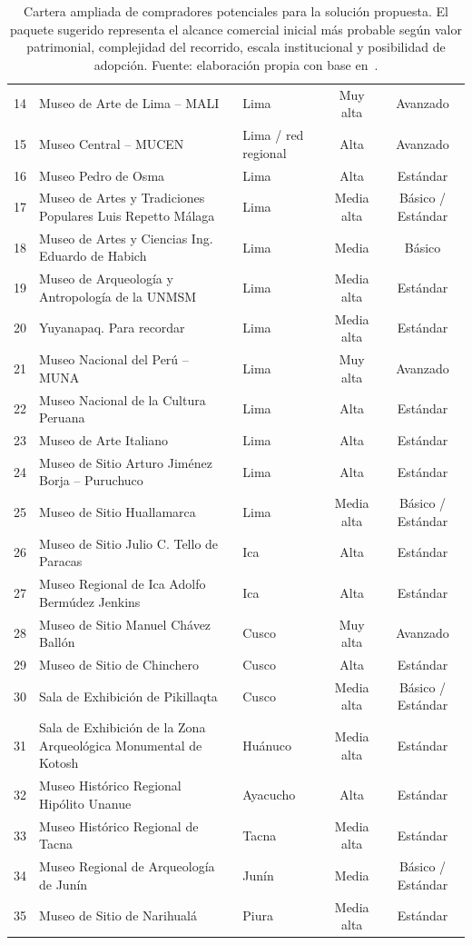 \begin{table}[h!]
{\begin{tabular}{c >{\raggedright\arraybackslash}p{7.3cm} >{\raggedright\arraybackslash}p{2.4cm} c c}
		14 & Museo de Arte de Lima -- MALI & Lima & Muy alta & Avanzado \\
		15 & Museo Central -- MUCEN & Lima / red regional & Alta & Avanzado \\
		16 & Museo Pedro de Osma & Lima & Alta & Estándar \\
		17 & Museo de Artes y Tradiciones Populares Luis Repetto Málaga & Lima & Media alta & Básico / Estándar \\
		18 & Museo de Artes y Ciencias Ing. Eduardo de Habich & Lima & Media & Básico \\
		19 & Museo de Arqueología y Antropología de la UNMSM & Lima & Media alta & Estándar \\
		20 & Yuyanapaq. Para recordar & Lima & Media alta & Estándar \\
		21 & Museo Nacional del Perú -- MUNA & Lima & Muy alta & Avanzado \\
		22 & Museo Nacional de la Cultura Peruana & Lima & Alta & Estándar \\
		23 & Museo de Arte Italiano & Lima & Alta & Estándar \\
		24 & Museo de Sitio Arturo Jiménez Borja -- Puruchuco & Lima & Alta & Estándar \\
		25 & Museo de Sitio Huallamarca & Lima & Media alta & Básico / Estándar \\
		26 & Museo de Sitio Julio C. Tello de Paracas & Ica & Alta & Estándar \\
		27 & Museo Regional de Ica Adolfo Bermúdez Jenkins & Ica & Alta & Estándar \\
		28 & Museo de Sitio Manuel Chávez Ballón & Cusco & Muy alta & Avanzado \\
		29 & Museo de Sitio de Chinchero & Cusco & Alta & Estándar \\
		30 & Sala de Exhibición de Pikillaqta & Cusco & Media alta & Básico / Estándar \\
		31 & Sala de Exhibición de la Zona Arqueológica Monumental de Kotosh & Huánuco & Media alta & Estándar \\
		32 & Museo Histórico Regional Hipólito Unanue & Ayacucho & Alta & Estándar \\
		33 & Museo Histórico Regional de Tacna & Tacna & Media alta & Estándar \\
		34 & Museo Regional de Arqueología de Junín & Junín & Media & Básico / Estándar \\
		35 & Museo de Sitio de Narihualá & Piura & Media alta & Estándar \\
		\hline
	\end{tabular}%
	}
	\caption[Cartera ampliada de compradores potenciales]{Cartera ampliada de compradores potenciales para la solución propuesta. El paquete sugerido representa el alcance comercial inicial más probable según valor patrimonial, complejidad del recorrido, escala institucional y posibilidad de adopción. Fuente: elaboración propia con base en~\cite{museoscultura,cultura2023guiamuseos,infocultura2023visitantes,naylamp2023visitantes,cultura2025evaluacion}.}
	\label{tab:compradores-potenciales-museiq}
\end{table}

